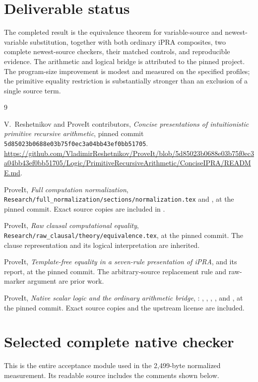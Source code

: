 \section{Deliverable status}

The completed result is the equivalence theorem for variable-source and
newest-variable substitution, together with both ordinary iPRA composites,
two complete newest-source checkers, their matched controls, and reproducible
evidence. The arithmetic and logical bridge is attributed to the pinned
project. The program-size improvement is modest and measured on the
specified profiles; the primitive equality restriction is substantially
stronger than an exclusion of a single source term.

\begin{thebibliography}{9}
\raggedright
{}
V.~Reshetnikov and ProveIt contributors,
\emph{Concise presentations of intuitionistic primitive recursive arithmetic},
pinned commit \texttt{5d85023b0688e03b75f0ec3a04bb43ef0bb51705}.
\url{https://github.com/VladimirReshetnikov/ProveIt/blob/5d85023b0688e03b75f0ec3a04bb43ef0bb51705/Logic/PrimitiveRecursiveArithmetic/ConciseIPRA/README.md}.

ProveIt, \emph{Full computation normalization},
\nolinkurl{Research/full_normalization/sections/normalization.tex} and
, at the pinned commit.
Exact source copies are included in .

ProveIt, \emph{Raw clausal computational equality},
\nolinkurl{Research/raw_clausal/theory/equivalence.tex}, at the pinned commit.
The clause representation and its logical interpretation are inherited.

ProveIt, \emph{Template-free equality in a seven-rule presentation of iPRA},
 and its report, at the pinned commit.
The arbitrary-source replacement rule and raw-marker argument are prior work.

ProveIt, \emph{Native scalar logic and the ordinary arithmetic bridge},
:
,
,
,
, and
, at the pinned commit.
Exact source copies and the upstream license are included.
\end{thebibliography}

\appendix
\section{Selected complete native checker}

This is the entire acceptance module used in the 2,499-byte normalized
measurement. Its readable source includes the comments shown below.

